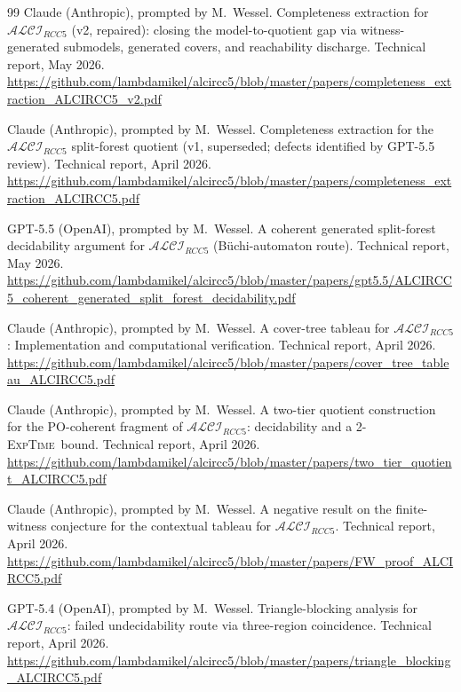\documentclass[
]{ceurart}
\theoremstyle{definition}
\newcommand{\ALCIRCC}[1]{\ensuremath{\mathcal{ALCI}_{\mathit{RCC#1}}}}
\newcommand{\EXPTIME}{\textsc{ExpTime}}
\begin{document}
\begin{thebibliography}{99}
Claude (Anthropic), prompted by M.\ Wessel.
\newblock Completeness extraction for $\ALCIRCC{5}$ (v2, repaired):
  closing the model-to-quotient gap via witness-generated submodels,
  generated covers, and reachability discharge.
\newblock Technical report, May 2026.
\newblock \url{https://github.com/lambdamikel/alcircc5/blob/master/papers/completeness_extraction_ALCIRCC5_v2.pdf}

Claude (Anthropic), prompted by M.\ Wessel.
\newblock Completeness extraction for the $\ALCIRCC{5}$ split-forest
  quotient (v1, superseded; defects identified by GPT-5.5 review).
\newblock Technical report, April 2026.
\newblock \url{https://github.com/lambdamikel/alcircc5/blob/master/papers/completeness_extraction_ALCIRCC5.pdf}

GPT-5.5 (OpenAI), prompted by M.\ Wessel.
\newblock A coherent generated split-forest decidability argument
  for $\ALCIRCC{5}$ (B\"uchi-automaton route).
\newblock Technical report, May 2026.
\newblock \url{https://github.com/lambdamikel/alcircc5/blob/master/papers/gpt5.5/ALCIRCC5_coherent_generated_split_forest_decidability.pdf}

Claude (Anthropic), prompted by M.\ Wessel.
\newblock A cover-tree tableau for $\ALCIRCC{5}$:
  Implementation and computational verification.
\newblock Technical report, April 2026.
\newblock \url{https://github.com/lambdamikel/alcircc5/blob/master/papers/cover_tree_tableau_ALCIRCC5.pdf}

Claude (Anthropic), prompted by M.\ Wessel.
\newblock A two-tier quotient construction for the PO-coherent
  fragment of $\ALCIRCC{5}$: decidability and a 2-\EXPTIME\ bound.
\newblock Technical report, April 2026.
\newblock \url{https://github.com/lambdamikel/alcircc5/blob/master/papers/two_tier_quotient_ALCIRCC5.pdf}

Claude (Anthropic), prompted by M.\ Wessel.
\newblock A negative result on the finite-witness conjecture for
  the contextual tableau for $\ALCIRCC{5}$.
\newblock Technical report, April 2026.
\newblock \url{https://github.com/lambdamikel/alcircc5/blob/master/papers/FW_proof_ALCIRCC5.pdf}

GPT-5.4 (OpenAI), prompted by M.\ Wessel.
\newblock Triangle-blocking analysis for $\ALCIRCC{5}$: failed
  undecidability route via three-region coincidence.
\newblock Technical report, April 2026.
\newblock \url{https://github.com/lambdamikel/alcircc5/blob/master/papers/triangle_blocking_ALCIRCC5.pdf}


\end{thebibliography}
\end{document}
